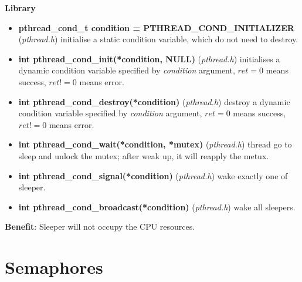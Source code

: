 \documentclass{article}
\begin{document}
\textbf{Library}

\begin{itemize}
    \item \textbf{pthread\_cond\_t condition = PTHREAD\_COND\_INITIALIZER} (\textit{pthread.h}) initialise a static condition variable, which do not need to destroy.
    \item \textbf{int pthread\_cond\_init(*condition, NULL)} (\textit{pthread.h}) initialises a dynamic condition variable specified by \textit{condition} argument, $ret = 0$ means success, $ret != 0$ means error.
    \item \textbf{int pthread\_cond\_destroy(*condition)} (\textit{pthread.h}) destroy a dynamic condition variable specified by \textit{condition} argument, $ret = 0$ means success, $ret != 0$ means error.
    \item \textbf{int pthread\_cond\_wait(*condition, *mutex)} (\textit{pthread.h}) thread go to sleep and unlock the mutex; after weak up, it will reapply the metux.
    \item \textbf{int pthread\_cond\_signal(*condition)} (\textit{pthread.h}) wake exactly one of sleeper.
    \item \textbf{int pthread\_cond\_broadcast(*condition)} (\textit{pthread.h}) wake all sleepers.
\end{itemize}

\begin{minipage}{\textwidth}

\begin{parcolumns}{2}


\end{parcolumns}
\end{minipage}

\textbf{Benefit}: Sleeper will not occupy the CPU resources.




\section{Semaphores}
\end{document}

